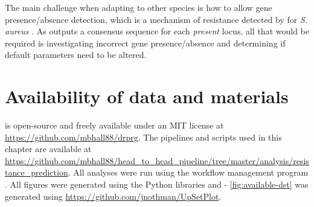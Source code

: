 The main challenge when adapting to other species is how to allow gene presence/absence detection, which is a mechanism of resistance detected by \mykrobe{} for \textit{S. aureus} \cite{bradley2015}. As \pandora{} outputs a consensus sequence for each \emph{present} locus, all that would be required is investigating incorrect gene presence/absence and determining if default parameters need to be altered.

\section{Availability of data and materials}

\drprg{} is open-source and freely available under an MIT license at \url{https://github.com/mbhall88/drprg}. The pipelines and scripts used in this chapter are available at \url{https://github.com/mbhall88/head_to_head_pipeline/tree/master/analysis/resistance_prediction}. All analyses were run using the workflow management program  \cite{snakemake2021}. All figures were generated using the Python libraries  \cite{matplotlib} and  \cite{seaborn} - \autoref{fig:available-dst} was generated using \url{https://github.com/jnothman/UpSetPlot}.

